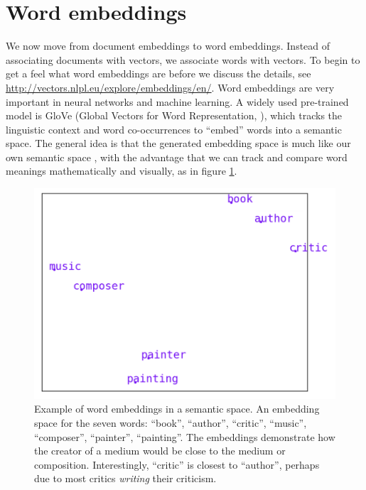 \section{Word embeddings}

We now move from document embeddings to word embeddings.  Instead of associating documents with vectors, we associate words with vectors. To begin to get a feel what word embeddings are before we discuss the details, see \url{http://vectors.nlpl.eu/explore/embeddings/en/}. Word embeddings are very important in neural networks and machine learning. A widely used pre-trained model is GloVe (Global Vectors for Word Representation, \cite{pennington2014glove}), which tracks the linguistic context and word co-occurrences to ``embed'' words into a semantic space. The general idea is that the generated embedding space is much like our own semantic space \cite{lewis2019distributional}, with the advantage that we can track and compare word meanings mathematically and visually, as in figure \ref{f:writerPainterExample}. 

\begin{figure}[h]
    \centering
    \includegraphics[scale=.5]{./images/Word_vector_demo.png}
    \caption[Generated using \url{http://vectors.nlpl.eu/explore/embeddings/en/}.]{Example of word embeddings in a semantic space. An embedding space for the seven words: ``book'', ``author'', ``critic'', ``music'', ``composer'', ``painter'', ``painting''. The embeddings demonstrate how the creator of a medium would be close to the medium or composition. Interestingly, ``critic'' is closest to ``author'', perhaps due to most critics \textit{writing} their criticism.}
 \label{f:writerPainterExample}
\end{figure}

